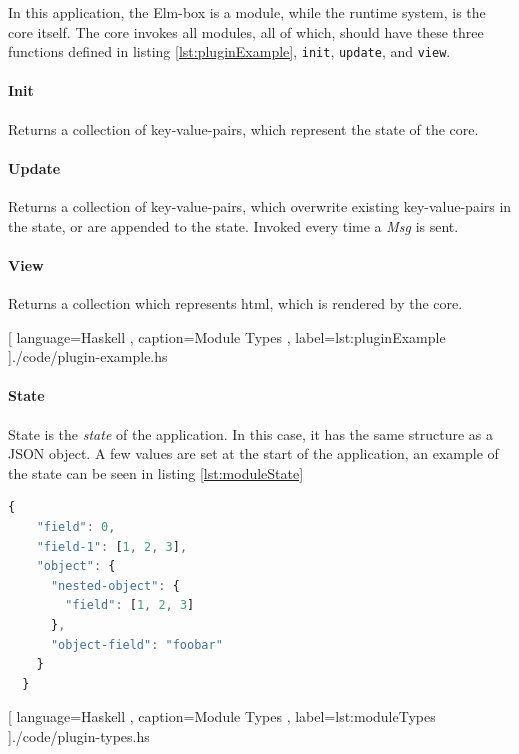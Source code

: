 In this application, the Elm-box is a module, while the runtime system, is the
core itself. The core invokes all modules, all of which, should have these three
functions defined in listing \ref{lst:pluginExample}, \lstinline{init},
\lstinline{update}, and \lstinline{view}.

\paragraph{Init} Returns a collection of key-value-pairs, which represent
the state of the core.

\paragraph{Update} Returns a collection of key-value-pairs, which
overwrite existing key-value-pairs in the state, or are appended to the state.
Invoked every time a \textit{Msg} is sent.

\paragraph{View} Returns a collection which represents \gls{html},
which is rendered by the core.

\begin{center}
  
    [ language=Haskell
    , caption={Module Types}
    , label=lst:pluginExample
    ]{./code/plugin-example.hs}
\end{center}

\paragraph{State}
State is the \textit{state} of the application. In this case, it has the same
structure as a JSON object. A few values are set at the start of the
application, an example of the state can be seen in listing
\ref{lst:moduleState}

\begin{lstlisting}[language=JavaScript, caption={State Example}, label=lst:moduleState]
  {
    "field": 0,
    "field-1": [1, 2, 3],
    "object": {
      "nested-object": {
        "field": [1, 2, 3]
      },
      "object-field": "foobar"
    }
  }
\end{lstlisting}

\begin{center}
  
    [ language=Haskell
    , caption={Module Types}
    , label=lst:moduleTypes
    ]{./code/plugin-types.hs}
\end{center}

